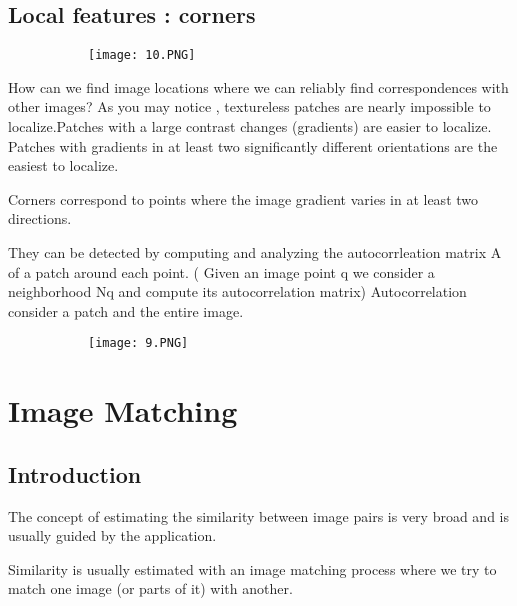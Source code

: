 \documentclass{article}
\begin{document}
\vspace{60mm}

\subsection{Local features : corners}

\begin{figure}[ht!]
  \centering
  \begin{subfigure}[b]{0.9\linewidth}
    \texttt{[image: 10.PNG]}
  \end{subfigure}
\end{figure}

How can we find image locations where we can reliably find correspondences with other images? As you may notice , textureless patches are nearly impossible to localize.Patches with a large contrast changes (gradients) are easier to localize. Patches with gradients in at least two significantly different orientations are the easiest to localize.



Corners correspond to points where the image gradient varies in at least two directions.

They can be detected by computing and analyzing the autocorrleation matrix A of a patch around each point. ( Given an image point q we consider a neighborhood Nq and compute its autocorrelation matrix)
Autocorrelation consider a patch and the entire image.

\begin{figure}[ht!]
  \centering
  \begin{subfigure}[b]{0.9\linewidth}
    \texttt{[image: 9.PNG]}
  \end{subfigure}
\end{figure}


\section{Image Matching}

\subsection{Introduction}

The concept of estimating the similarity between image pairs is very broad and is usually guided by the application.

Similarity is usually estimated with an image matching process where we try to match one image (or parts of it) with another.
\end{document}
